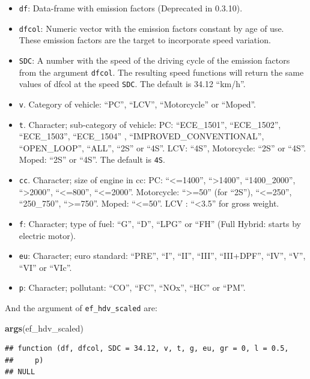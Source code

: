 \documentclass[12pt,graybox,envcountchap,sectrefs]{krantz}
\makeatletter
\newenvironment{Shaded}{\begin{snugshade}}{\end{snugshade}}
\newcommand{\KeywordTok}[1]{\textcolor[rgb]{0.13,0.29,0.53}{\textbf{#1}}}
\newcommand{\NormalTok}[1]{#1}
\providecommand{\tightlist}{%
  \setlength{\itemsep}{0pt}\setlength{\parskip}{0pt}}
\newenvironment{kframe}{%
\medskip{}
\setlength{\fboxsep}{.8em}
 \def\at@end@of@kframe{}%
 \ifinner\ifhmode%
  \def\at@end@of@kframe{\end{minipage}}%
  \begin{minipage}{\columnwidth}%
 \fi\fi%
 \def\FrameCommand##1{\hskip\@totalleftmargin \hskip-\fboxsep
 \colorbox{shadecolor}{##1}\hskip-\fboxsep
     \hskip-\linewidth \hskip-\@totalleftmargin \hskip\columnwidth}%
 \MakeFramed {\advance\hsize-\width
   \@totalleftmargin\z@ \linewidth\hsize
   \@setminipage}}%
 {\par\unskip\endMakeFramed%
 \at@end@of@kframe}
\renewenvironment{Shaded}{\begin{kframe}}{\end{kframe}}
\theoremstyle{definition}
\theoremstyle{definition}
\theoremstyle{definition}
\theoremstyle{remark}
\makeatother
\begin{document}
\begin{itemize}
\tightlist
\item
  \texttt{df}: Data-frame with emission factors (Deprecated in 0.3.10).
\item
  \texttt{dfcol}: Numeric vector with the emission factors constant by
  age of use. These emission factors are the target to incorporate speed
  variation.
\item
  \texttt{SDC}: A number with the speed of the driving cycle of the
  emission factors from the argument \texttt{dfcol}. The resulting speed
  functions will return the same values of dfcol at the speed
  \texttt{SDC}. The default is 34.12 ``km/h''.
\item
  \texttt{v}. Category of vehicle: ``PC'', ``LCV'', ``Motorcycle'' or
  ``Moped''.
\item
  \texttt{t}. Character; sub-category of vehicle: PC: ``ECE\_1501'',
  ``ECE\_1502'', ``ECE\_1503'', ``ECE\_1504'' ,
  ``IMPROVED\_CONVENTIONAL'', ``OPEN\_LOOP'', ``ALL'', ``2S'' or ``4S''.
  LCV: ``4S'', Motorcycle: ``2S'' or ``4S''. Moped: ``2S'' or ``4S''.
  The default is \texttt{4S}.
\item
  \texttt{cc}. Character; size of engine in cc: PC:
  ``\textless{}=1400'', ``\textgreater{}1400'', ``1400\_2000'',
  ``\textgreater{}2000'', ``\textless{}=800'', ``\textless{}=2000''.
  Motorcycle: ``\textgreater{}=50'' (for ``2S''), ``\textless{}=250'',
  ``250\_750'', ``\textgreater{}=750''. Moped: ``\textless{}=50''. LCV :
  ``\textless{}3.5'' for gross weight.
\item
  \texttt{f}: Character; type of fuel: ``G'', ``D'', ``LPG'' or ``FH''
  (Full Hybrid: starts by electric motor).
\item
  \texttt{eu}: Character; euro standard: ``PRE'', ``I'', ``II'',
  ``III'', ``III+DPF'', ``IV'', ``V'', ``VI'' or ``VIc''.
\item
  \texttt{p}: Character; pollutant: ``CO'', ``FC'', ``NOx'', ``HC'' or
  ``PM''.
\end{itemize}

And the argument of \texttt{ef\_hdv\_scaled} are:

\begin{Shaded}
\begin{Highlighting}[]
\KeywordTok{args}\NormalTok{(ef_hdv_scaled)}
\end{Highlighting}
\end{Shaded}

\begin{verbatim}
## function (df, dfcol, SDC = 34.12, v, t, g, eu, gr = 0, l = 0.5, 
##     p) 
## NULL
\end{verbatim}
\end{document}
